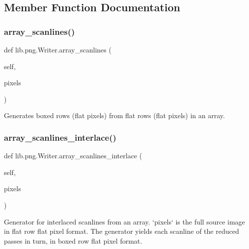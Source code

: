 \subsection{Member Function Documentation}
\mbox{\label{classlib_1_1png_1_1_writer_ad30399faaa028e3ea5f4e3eb19b235c5}} 
\subsubsection{\texorpdfstring{array\+\_\+scanlines()}{array\_scanlines()}}
{\footnotesize\ttfamily def lib.\+png.\+Writer.\+array\+\_\+scanlines (\begin{DoxyParamCaption}\item[{}]{self,  }\item[{}]{pixels }\end{DoxyParamCaption})}

\begin{DoxyVerb}Generates boxed rows (flat pixels) from flat rows (flat pixels)
in an array.
\end{DoxyVerb}
 \mbox{\label{classlib_1_1png_1_1_writer_a1490da1ba99a6e8d773fcc424ed6319b}} 
\subsubsection{\texorpdfstring{array\+\_\+scanlines\+\_\+interlace()}{array\_scanlines\_interlace()}}
{\footnotesize\ttfamily def lib.\+png.\+Writer.\+array\+\_\+scanlines\+\_\+interlace (\begin{DoxyParamCaption}\item[{}]{self,  }\item[{}]{pixels }\end{DoxyParamCaption})}

\begin{DoxyVerb}Generator for interlaced scanlines from an array.  `pixels` is
the full source image in flat row flat pixel format.  The
generator yields each scanline of the reduced passes in turn, in
boxed row flat pixel format.
\end{DoxyVerb}
 \mbox{\label{classlib_1_1png_1_1_writer_a4d9ce06af9b7bf52009dc7a2a9f13f37}} 

